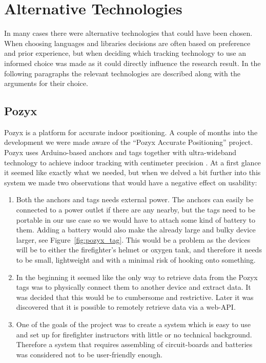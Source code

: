 \documentclass[../Main/thesis.tex]{subfiles}
\begin{document}
\section{Alternative Technologies}
In many cases there were alternative technologies that could have been chosen.
When choosing languages and libraries decisions are often based on preference and prior experience, but when deciding which tracking technology to use an informed choice was made as it could directly influence the research result.
In the following paragraphs the relevant technologies are described along with the arguments for their choice.

\subsection{Pozyx}
Pozyx is a platform for accurate indoor positioning.
A couple of months into the development we were made aware of the ``Pozyx Accurate Positioning'' project.
Pozyx uses Arduino-based anchors and tags together with ultra-wideband technology to achieve indoor tracking with centimeter precision \citep{Pozyx2017}.
At a first glance it seemed like exactly what we needed, but when we delved a bit further into this system we made two observations that would have a negative effect on usability:
\begin{enumerate}
	\item{Both the anchors and tags needs external power. 
		The anchors can easily be connected to a power outlet if there are any nearby, but the tags need to be portable in our use case so we would have to attach some kind of battery to them.
		Adding a battery would also make the already large and bulky device larger, see Figure~\ref{fig:pozyx_tag}.
		This would be a problem as the devices will be to either the firefighter's helmet or oxygen tank, and therefore it needs to be small, lightweight and with a minimal risk of hooking onto something.
	}

	\item{In the beginning it seemed like the only way to retrieve data from the Pozyx tags was to physically connect them to another device and extract data.
		It was decided that this would be to cumbersome and restrictive.
		Later it was discovered that it is possible to remotely retrieve data via a web-API.}

	\item{One of the goals of the project was to create a system which is easy to use and set up for firefighter instructors with little or no technical background.
		Therefore a system that requires assembling of circuit-boards and batteries was considered not to be user-friendly enough.}
\end{enumerate}
\end{document}
